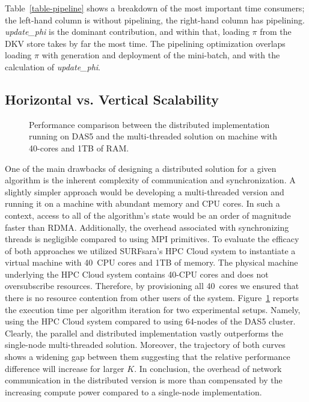 Table~\ref{table-pipeline} shows a breakdown of the most important time
consumers; the left-hand column is without pipelining, the right-hand
column has pipelining. \textit{update\_phi} is the dominant contribution,
and within that, loading $\pi$ from the DKV store takes by far the most time.
The pipelining optimization overlaps loading $\pi$ with generation and
deployment of the mini-batch, and with the calculation of \textit{update\_phi}.

\subsection{Horizontal vs. Vertical Scalability}
\begin{figure}[t] %
  \centering
  \caption{Performance comparison between the distributed implementation
  running on DAS5 and the multi-threaded solution on machine with 40-cores and
  1TB of RAM.}
  \label{fig-scale-up}
\end{figure}
One of the main drawbacks of designing a distributed solution for a given
algorithm is the inherent complexity of communication and synchronization. A
slightly simpler approach would be developing a multi-threaded version and
running it on a machine with abundant memory and CPU cores. In such a context,
access to all of the algorithm's state would be an order of magnitude faster
than RDMA. Additionally, the overhead associated with synchronizing threads is
negligible compared to using MPI primitives. To evaluate the efficacy of both
approaches we utilized SURFsara's HPC Cloud system to instantiate a virtual
machine with 40~CPU cores and 1TB of memory. The physical machine underlying
the HPC Cloud system contains 40-CPU cores and does not oversubscribe
resources. Therefore, by provisioning all 40~cores we ensured that there is no
resource contention from other users of the system. Figure~\ref{fig-scale-up}
reports the execution time per algorithm iteration for two experimental setups.
Namely, using the HPC Cloud system compared to using 64-nodes of the DAS5
cluster. Clearly, the parallel and distributed implementation vastly
outperforms the single-node multi-threaded solution. Moreover, the trajectory
of both curves shows a widening gap between them suggesting that the relative
performance difference will increase for larger $K$.
%
In conclusion, the overhead of network communication in the distributed version
is more than compensated by the increasing compute power compared to
a single-node implementation.


